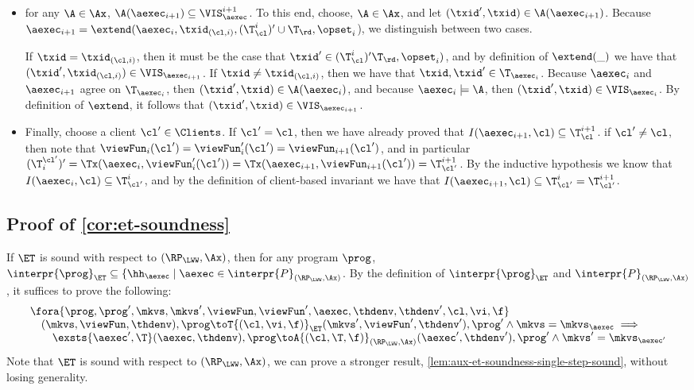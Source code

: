 \begin{itemize}
\item for any $\A \in \Ax$, $\A(\aexec_{i+1}) \subseteq \VIS_{\aexec}^{i+1}$. 
To this end, choose, $\A \in \Ax$, and let $(\txid', \txid) \in \A(\aexec_{i+1})$. 
Because $\aexec_{i+1} = \extend(\aexec_{i}, \txid_{(\cl, i)}, (\T_{\cl}^{i})' \cup \T_\rd, \opset_{i}$), 
we distinguish between two cases.

If $\txid = \txid_{(\cl, i)}$, then it must be the case that $\txid' \in (\T^{i}_{\cl})' \T_\rd, \opset_{i})$, 
and by definition of $\extend(\_)$ we have that $(\txid' ,\txid_{(\cl, i)}) \in \VIS_{\aexec_{i+1}}$. 
If $\txid \neq \txid_{(\cl, i)}$, then we have that $\txid, \txid' \in \T_{\aexec_{i}}$. Because 
$\aexec_{i}$ and $\aexec_{i+1}$ agree on $\T_{\aexec_{i}}$, then $(\txid', \txid) \in \A(\aexec_{i})$, 
and because $\aexec_{i} \models \A$, then $(\txid', \txid) \in \VIS_{\aexec_{i}}$. By definition of 
$\extend$, it follows that $(\txid', \txid) \in \VIS_{\aexec_{i+1}}$.

\item Finally, choose a client $\cl' \in \Clients$. If $\cl' = \cl$, then we have already proved that 
$I(\aexec_{i+1}, \cl) \subseteq \T_{\cl}^{i+1}$. 
if $\cl' \neq \cl$, then note that $\viewFun_{i}(\cl') = \viewFun'_{i}(\cl') = \viewFun_{i+1}(\cl')$, 
and in particular $(\T^{\cl'}_{i})' = \Tx(\aexec_{i}, \viewFun'_{i}(\cl')) = \Tx(\aexec_{i+1}, \viewFun_{i+1}(\cl')) =  \T_{\cl'}^{i+1}$.
By the inductive hypothesis we know that $I(\aexec_{i}, \cl) \subseteq \T_{\cl'}^{i}$, 
and by the definition of client-based invariant we have that $I(\aexec_{i+1}, \cl) \subseteq \T_{\cl'}^{i} = \T_{\cl'}^{i+1}$. 
\end{itemize}

\subsection{Proof of \cref{cor:et-soundness}}
\label{sec:cor-et-soundness}

If $\ET$ is sound with respect to $(\RP_{\LWW}, \Ax)$, then 
for any program $\prog$, $\interpr{\prog}_{\ET} \subseteq \{ \hh_{\aexec} \mid \aexec \in \interpr{P}_{(\RP_{\LWW}, \Ax)}$.
By the definition of \( \interpr{\prog}_{\ET} \) and \( \interpr{P}_{(\RP_{\LWW}, \Ax)} \), it suffices to prove the following:
\[
\begin{array}{@{}l@{}}
    \fora{\prog,\prog',\mkvs,\mkvs',\viewFun,\viewFun',\aexec,\thdenv,\thdenv',\cl,\vi,\f} \\
    \quad (\mkvs, \viewFun, \thdenv), \prog \toT{(\cl, \vi, \f)}_{\ET} (\mkvs', \viewFun', \thdenv'), \prog'
    \land \mkvs = \mkvs_{\aexec}
    \implies {} \\
    \qquad \exsts{\aexec',\T}
    (\aexec, \thdenv), \prog \toA{(\cl, \T, \f)}_{(\RP_{\LWW}, \Ax)} (\aexec', \thdenv'), \prog' 
    \land \mkvs' = \mkvs_{\aexec'}  
\end{array}
\]
Note that \( \ET \) is sound with respect to \( (\RP_{\LWW}, \Ax) \), we can prove a stronger result, \ie \cref{lem:aux-et-soundness-single-step-sound}, without losing generality.

